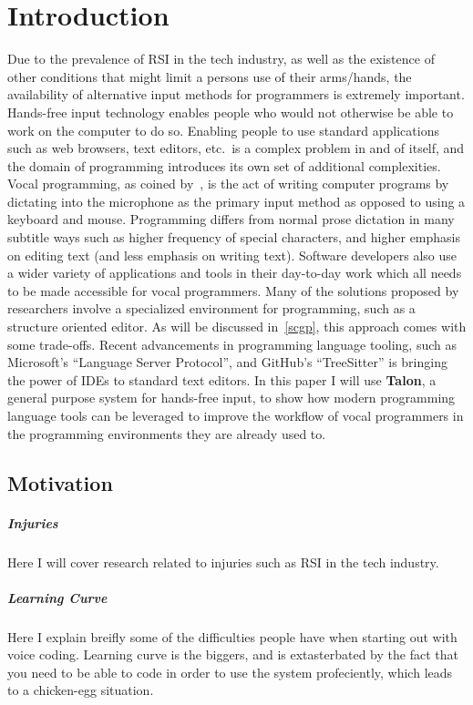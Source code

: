\documentclass[a4paper,english]{ifimaster}
\begin{document}
\chapter{Introduction}
Due to the prevalence of RSI in the tech industry, as well as the existence of other conditions that might limit a persons use of their arms/hands, the availability
of alternative input methods for programmers is extremely important.
Hands-free input technology enables people who would not otherwise be able to work on the computer to do so.
Enabling people to use standard applications such as web browsers, text editors, etc.\ is a complex problem in and of itself, and the domain of programming
introduces its own set of additional complexities.
Vocal programming, as coined by~\parencite{Arnold}, is the act of writing computer programs by dictating into the microphone as the primary input method as opposed to using a keyboard and mouse.
Programming differs from normal prose dictation in many subtitle ways such as higher frequency of special characters, and higher emphasis on editing text (and less emphasis on writing text).
Software developers also use a wider variety of applications and tools in their day-to-day work which all needs to be made accessible for vocal programmers.
Many of the solutions proposed by researchers involve a specialized environment for programming, such as a structure oriented editor.
As will be discussed in~\ref{scgp}, this approach comes with some trade-offs.
Recent advancements in programming language tooling, such as Microsoft's ``Language Server Protocol'', and GitHub's ``TreeSitter'' is bringing the power of IDEs to standard text editors.
In this paper I will use \textbf{Talon}, a general purpose system for hands-free input, to show how modern programming language
   tools can be leveraged to improve the workflow of vocal programmers in the programming environments they are already used to.

\section{Motivation}
\paragraph{Injuries}
Here I will cover research related to injuries such as RSI in the tech industry.
\paragraph{Learning Curve}
Here I explain breifly some of the difficulties people have when starting out with voice coding.
Learning curve is the biggers, and is extasterbated by the fact that you need
to be able to code in order to use the system profeciently, which leads to a 
chicken-egg situation.
\end{document}
